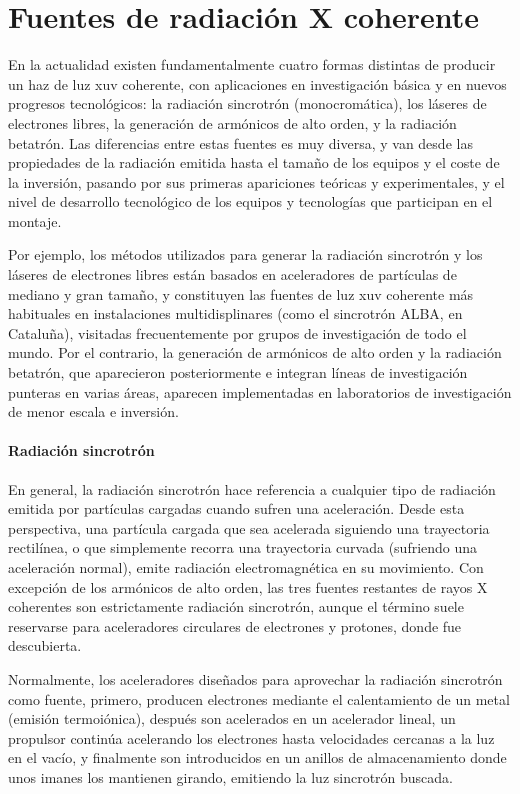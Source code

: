 \section{Fuentes de radiación X coherente}\label{sec:1.3}
En la actualidad existen fundamentalmente cuatro formas distintas de producir un haz de luz \acrshort{xuv} coherente, con aplicaciones en investigación básica y en nuevos progresos tecnológicos: la radiación sincrotrón (monocromática), los láseres de electrones libres, la generación de armónicos de alto orden, y la radiación betatrón. Las diferencias entre estas fuentes es muy diversa, y van desde las propiedades de la radiación emitida hasta el tamaño de los equipos y el coste de la inversión, pasando por sus primeras apariciones teóricas y experimentales, y el nivel de desarrollo tecnológico de los equipos y tecnologías que participan en el montaje. 

Por ejemplo, los métodos utilizados para generar la radiación sincrotrón y los láseres de electrones libres están basados en aceleradores de partículas de mediano y gran tamaño, y constituyen las fuentes de luz \acrshort{xuv} coherente más habituales en instalaciones multidisplinares (como el sincrotrón ALBA, en Cataluña), visitadas frecuentemente por grupos de investigación de todo el mundo. Por el contrario, la generación de armónicos de alto orden y la radiación betatrón, que aparecieron posteriormente e integran líneas de investigación punteras en varias áreas, aparecen implementadas en laboratorios de investigación de menor escala e inversión.

\paragraph{Radiación sincrotrón}
En general, la radiación sincrotrón hace referencia a cualquier tipo de radiación emitida por partículas cargadas cuando sufren una aceleración. Desde esta perspectiva, una partícula cargada que sea acelerada siguiendo una trayectoria rectilínea, o que simplemente recorra una trayectoria curvada (sufriendo una aceleración normal), emite radiación electromagnética en su movimiento. Con excepción de los armónicos de alto orden, las tres fuentes restantes de rayos X coherentes son estrictamente radiación sincrotrón, aunque el término suele reservarse para aceleradores circulares de electrones y protones, donde fue descubierta.

Normalmente, los aceleradores diseñados para aprovechar la radiación sincrotrón como fuente, primero, producen electrones mediante el calentamiento de un metal (emisión termoiónica), después son acelerados en un acelerador lineal, un propulsor continúa acelerando los electrones hasta velocidades cercanas a la luz en el vacío, y finalmente son introducidos en un anillos de almacenamiento donde unos imanes los mantienen girando, emitiendo la luz sincrotrón buscada. 


